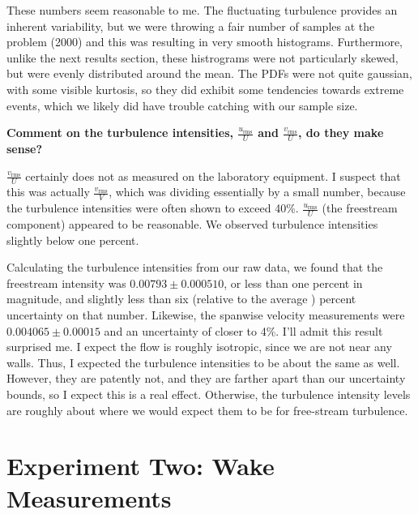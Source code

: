 \documentclass{article}
\begin{document}
These numbers seem reasonable to me. The fluctuating turbulence
provides an inherent variability, but we were throwing a fair number of
samples at the problem (2000) and this was resulting in very smooth
histograms. Furthermore, unlike the next results section, these
histrograms were not particularly skewed, but were evenly distributed
around the mean. The PDFs were not quite gaussian, with some visible
kurtosis, so they did exhibit some tendencies towards extreme events,
which we likely did have trouble catching with our sample
size.



\textbf{Comment on the turbulence intensities,
$\frac{u_{\text{rms}}}{U}$ and $\frac{v_{\text{rms}}}{U}$, do they make sense?}

$\frac{v_{\text{rms}}}{U}$ certainly does not as measured on the
laboratory equipment. I suspect that this was actually
$\frac{v_{\text{rms}}}{V}$, which was dividing essentially by a small number,
because the turbulence intensities were often shown to exceed 40\%. 
$\frac{u_{\text{rms}}}{U}$ (the freestream component) appeared to be
reasonable. We observed turbulence intensities slightly below one
percent. 

Calculating the turbulence intensities from our raw data, we found that
the freestream intensity was $0.00793 \pm 0.000510$, or less than one
percent in magnitude, and slightly less than six (relative to the
average ) percent uncertainty on that number. Likewise, the spanwise
velocity measurements were $0.004065 \pm 0.00015$ and an uncertainty of
closer to 4\%. I'll admit this result surprised me.
I expect the flow is roughly isotropic, since we are not near any walls. 
Thus, I expected the turbulence intensities to be about the same as
well. However, they are patently not, and they are farther apart than
our uncertainty bounds, so I expect this is a real effect. Otherwise,
the turbulence intensity levels are roughly about where we would expect
them to be for free-stream turbulence. 


\section{Experiment Two: Wake Measurements}
\end{document}
